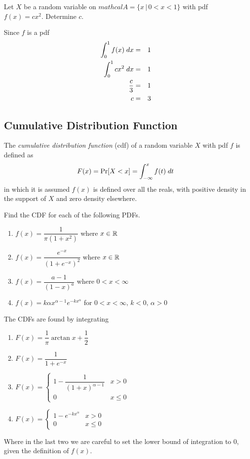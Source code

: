 \documentclass[../main.tex]{subfiles}
\begin{document}
\begin{example}
Let $X$ be a random variable on $mathcal{A} = \{x \, | \, 0<x<1\}$ with pdf $f(x) = cx^2$. Determine $c$.
\end{example}
\begin{solution}
Since $f$ is a pdf
\begin{eqnarray*}
    \int_0^1 f(x) \;dx &=& 1 \\
    \int_0^1 cx^2 \;dx&=& 1 \\
    \dfrac{c}{3} &=& 1 \\
    c &=& 3
\end{eqnarray*}
\end{solution}

\subsection{Cumulative Distribution Function}
\begin{definition}
The \textit{cumulative distribution function} (cdf) of a random variable $X$ with pdf $f$ is defined as
$$F(x) = \mathrm{Pr}[X < x] = \int_{-\infty}^x f(t) \;dt$$
in which it is assumed $f(x)$ is defined over all the reals, with positive density in the support of $X$ and zero density
elsewhere.
\end{definition}

\begin{example}
Find the CDF for each of the following PDFs.
\begin{enumerate}
    \item $f(x) = \dfrac{1}{\pi(1+x^2)}$ where $x \in \mathbb{R}$
    \item $f(x) = \dfrac{e^{-x}}{(1+e^{-x})^2}$ where $x \in \mathbb{R}$
    \item $f(x) = \dfrac{a-1}{(1-x)^a}$ where $0<x<\infty$
    \item $f(x) = k\alpha x^{\alpha-1}e^{-kx^{\alpha}}$ for $ 0<x<\infty,\,k<0,\,\alpha>0$
\end{enumerate}
\begin{solution}
The CDFs are found by integrating

\begin{enumerate}
    \item $F(x) = \dfrac{1}{\pi}\arctan x + \dfrac{1}{2}$
    \item $F(x) = \dfrac{1}{1+e^{-x}}$
    \item $F(x) = 
        \begin{cases}
            1 - \dfrac{1}{(1+x)^{\alpha-1}} & x>0\\
            0 & x \leq 0
        \end{cases}$
    \item $F(x) =
        \begin{cases}
            1 - e^{-kx^\alpha} & x>0 \\
            0 & x \leq 0
        \end{cases}$
\end{enumerate}
Where in the last two we are careful to set the lower bound of integration to 0, given the definition of $f(x)$.
\end{solution}
\end{example}
\end{document}

